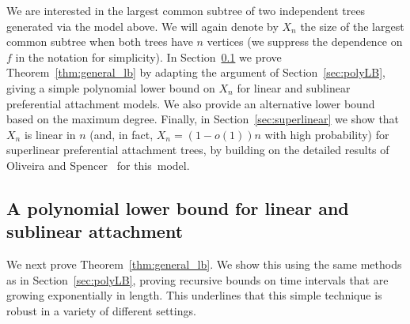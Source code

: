 \documentclass[11pt]{article}
\numberwithin{equation}{section}
\theoremstyle{definition}
\begin{document}
We are interested in the largest common subtree of two independent trees generated via the model above. We will again denote by $X_{n}$ the size of the largest common subtree when both trees have $n$ vertices (we suppress the dependence on $f$ in the notation for simplicity). 
In Section~\ref{sec:linear} we prove Theorem~\ref{thm:general_lb} by adapting the argument of Section~\ref{sec:polyLB}, 
giving a simple polynomial lower bound on $X_{n}$ for linear and sublinear preferential attachment models. We also provide an alternative lower bound based on the maximum degree. 
Finally, in Section~\ref{sec:superlinear} we show that $X_{n}$ is linear in $n$ (and, in fact, $X_{n} = (1-o(1))n$ with high probability) for superlinear preferential attachment trees, by building on the detailed results of Oliveira and Spencer~\cite{oliveira2005connectivity} for this~model. 


\subsection{A polynomial lower bound for linear and sublinear attachment}\label{sec:linear}


We next prove Theorem~\ref{thm:general_lb}. 
We show this using the same methods as in Section~\ref{sec:polyLB}, proving recursive bounds on time intervals that are growing exponentially in length. This underlines that this simple technique is robust in a variety of different settings. 
\end{document}
